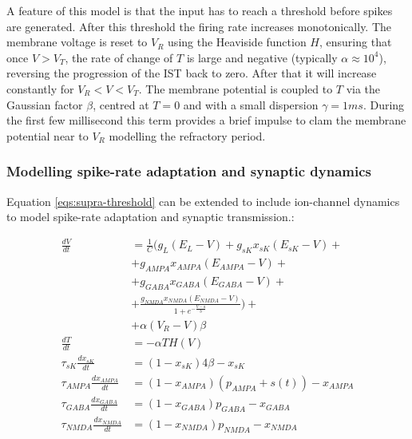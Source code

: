 		A feature of this model is that the input has to reach a threshold before spikes are generated.
		After this threshold the firing rate increases monotonically.
		The membrane voltage is reset to $V_R$ using the Heaviside function $H$, ensuring that once $V>V_T$, the rate of change of $T$ is large and negative (typically $\alpha\approx 10^4$), reversing the progression of the IST back to zero.
		After that it will increase constantly for $V_R<V<V_T$.
		The membrane potential is coupled to $T$ via the Gaussian factor $\beta$, centred at $T=0$ and with a small dispersion $\gamma=1ms$.
		During the first few millisecond this term provides a brief impulse to clam the membrane potential near to $V_R$ modelling the refractory period.

		\subsubsection{Modelling spike-rate adaptation and synaptic dynamics}
		Equation \ref{eqs:supra-threshold} can be extended to include ion-channel dynamics to model spike-rate adaptation and synaptic transmission.:

		\begin{equation}
			\begin{aligned}
				\frac{dV}{dt} &= \frac{1}{C}\biggl(g_L(E_L-V)+g_{sK}x_{sK}(E_{sK}-V) +\\
				& +g_{\scriptscriptstyle{AMPA}}x_{\scriptscriptstyle{AMPA}}(E_{\scriptscriptstyle{AMPA}}-V) +\\
				& +g_{\scriptscriptstyle{GABA}}x_{\scriptscriptstyle{GABA}}(E_{\scriptscriptstyle{GABA}}-V) +\\
				& +\frac{g_{\scriptscriptstyle{NMDA}}x_{\scriptscriptstyle{NMDA}}(E_{\scriptscriptstyle{NMDA}}-V)}{1+e^{-\frac{V-a}{b}}}\biggr)+\\
				& + \alpha(V_R-V)\beta\\
				\frac{dT}{dt} &= -\alpha TH(V)\\
				\tau_{sK}\frac{dx_{sK}}{dt} &= (1-x_{sK})4\beta-x_{sK}\\
				\tau_{\scriptscriptstyle{AMPA}}\frac{dx_{\scriptscriptstyle{AMPA}}}{dt} &= (1-x_{\scriptscriptstyle{AMPA}})(p_{\scriptscriptstyle{AMPA}}+s(t))-x_{\scriptscriptstyle{AMPA}}\\
				\tau_{\scriptscriptstyle{GABA}}\frac{dx_{\scriptscriptstyle{GABA}}}{dt} &= (1-x_{\scriptscriptstyle{GABA}})p_{\scriptscriptstyle{GABA}}-x_{\scriptscriptstyle{GABA}}\\
				\tau_{\scriptscriptstyle{NMDA}}\frac{dx_{\scriptscriptstyle{NMDA}}}{dt} &= (1-x_{\scriptscriptstyle{NMDA}})p_{\scriptscriptstyle{NMDA}}-x_{\scriptscriptstyle{NMDA}}\\
				\label{eqs:synaptic-dynamics}
			\end{aligned}
		\end{equation}

